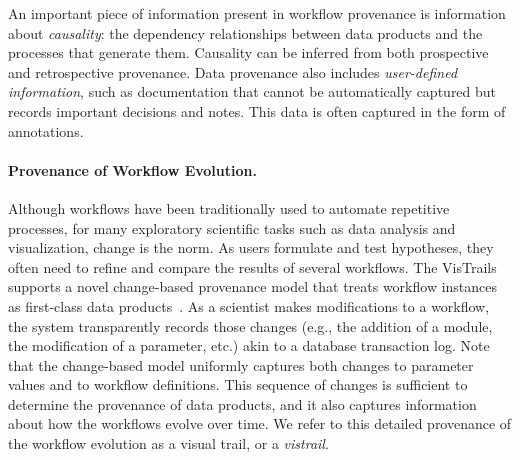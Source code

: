 \documentclass[12pt]{iopart}
\makeatletter
\newcommand{\eg}{e.g.,\xspace}
\newcommand{\etc}{etc.\@\xspace}
\makeatother
\begin{document}
An important piece of information present in workflow provenance is
information about \emph{causality}: the dependency relationships
between data products and the processes that generate them.  Causality
can be inferred from both prospective and retrospective provenance.
Data provenance also includes \emph{user-defined information}, such as
documentation that cannot be automatically captured but records
important decisions and notes.  This data is often captured in the
form of annotations.

\paragraph{Provenance of Workflow Evolution.}
%
Although workflows have been traditionally used to automate repetitive
processes, for many exploratory scientific tasks such as data analysis
and visualization, change is the norm. As users formulate and test
hypotheses, they often need to refine and compare the results of
several workflows. The VisTrails~\cite{vistrails} supports a novel
change-based provenance model that treats workflow instances as
first-class data
products~\cite{Freire:2006:IPAW,callahan@sciflow2006}.  As a scientist
makes modifications to a workflow, the system transparently records
those changes (\eg the addition of a module, the modification of a
parameter, \etc) akin to a database transaction log. Note that the
change-based model uniformly captures both changes to parameter values
and to workflow definitions. This sequence of changes is sufficient to
determine the provenance of data products, and it also captures
information about how the workflows evolve over time.  We refer to
this detailed provenance of the workflow evolution as a visual trail,
or a \emph{vistrail}.
\end{document}
